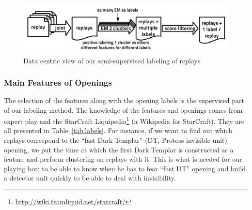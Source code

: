 \begin{figure}[h]
\centerline{\includegraphics[width=0.80\columnwidth]{images/replays_labeling.pdf}}
\caption{Data centric view of our semi-supervised labeling of replays}
\label{replays_labeling}
\end{figure}

\subsubsection{Main Features of Openings}

The selection of the features along with the opening labels is the supervised part of our labeling method. The knowledge of the features and openings comes from expert play and the StarCraft Liquipedia\footnote{\url{http://wiki.teamliquid.net/starcraft/}} (a Wikipedia for StarCraft). They are all presented in Table~\ref{tab:labels}. For instance, if we want to find out which replays correspond to the ``fast Dark Templar'' (DT, Protoss invisible unit) opening, we put the time at which the first Dark Templar is constructed as a feature and perform clustering on replays with it. This is what is needed for our playing bot: to be able to know when he has to fear ``fast DT'' opening and build a detector unit quickly to be able to deal with invisibility.


